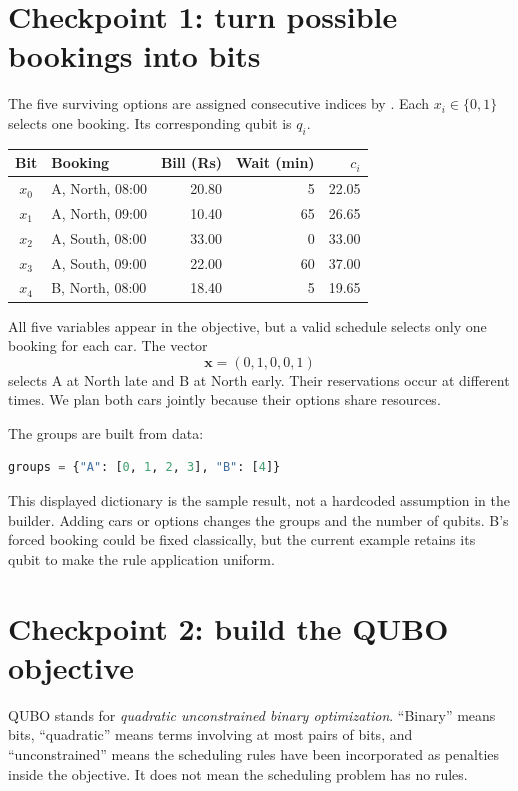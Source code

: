 \section{Checkpoint 1: turn possible bookings into bits}
The five surviving options are assigned consecutive indices by
. Each $x_i\in\{0,1\}$ selects one booking. Its corresponding
qubit is $q_i$.
\begin{center}
\begin{tabular}{clrrr}
\toprule
Bit & Booking & Bill (Rs) & Wait (min) & $c_i$\\
\midrule
$x_0$ & A, North, 08:00 & 20.80 & 5 & 22.05\\
$x_1$ & A, North, 09:00 & 10.40 & 65 & 26.65\\
$x_2$ & A, South, 08:00 & 33.00 & 0 & 33.00\\
$x_3$ & A, South, 09:00 & 22.00 & 60 & 37.00\\
$x_4$ & B, North, 08:00 & 18.40 & 5 & 19.65\\
\bottomrule
\end{tabular}
\end{center}
All five variables appear in the objective, but a valid schedule selects only
one booking for each car. The vector
\begin{equation}
\boldsymbol{x}=(0,1,0,0,1)
\end{equation}
selects A at North late and B at North early. Their reservations occur at
different times. We plan both cars jointly because their options share resources.

The groups are built from data:
\begin{lstlisting}[language=Python]
groups = {"A": [0, 1, 2, 3], "B": [4]}
\end{lstlisting}
This displayed dictionary is the sample result, not a hardcoded assumption in
the builder. Adding cars or options changes the groups and the number of qubits.
B's forced booking could be fixed classically, but the current example retains
its qubit to make the rule application uniform.

\section{Checkpoint 2: build the QUBO objective}\label{sec:qubo}
QUBO stands for \emph{quadratic unconstrained binary optimization}. ``Binary''
means bits, ``quadratic'' means terms involving at most pairs of bits, and
``unconstrained'' means the scheduling rules have been incorporated as penalties
inside the objective. It does not mean the scheduling problem has no rules.

